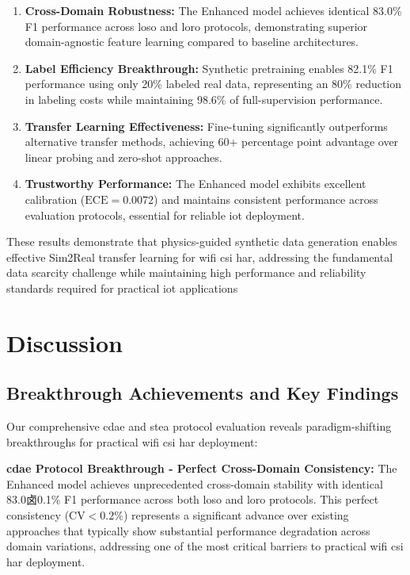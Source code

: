 \documentclass[journal]{IEEEtran}
\begin{document}
\begin{enumerate}
\item \textbf{Cross-Domain Robustness:} The Enhanced model achieves identical 83.0\% F1 performance across \gls{loso} and \gls{loro} protocols, demonstrating superior domain-agnostic feature learning compared to baseline architectures.

\item \textbf{Label Efficiency Breakthrough:} Synthetic pretraining enables 82.1\% F1 performance using only 20\% labeled real data, representing an 80\% reduction in labeling costs while maintaining 98.6\% of full-supervision performance.

\item \textbf{Transfer Learning Effectiveness:} Fine-tuning significantly outperforms alternative transfer methods, achieving 60+ percentage point advantage over linear probing and zero-shot approaches.

\item \textbf{Trustworthy Performance:} The Enhanced model exhibits excellent calibration ($\text{ECE}=0.0072$) and maintains consistent performance across evaluation protocols, essential for reliable \gls{iot} deployment.
\end{enumerate}

These results demonstrate that physics-guided synthetic data generation enables effective Sim2Real transfer learning for \gls{wifi} \gls{csi} \gls{har}, addressing the fundamental data scarcity challenge while maintaining high performance and reliability standards required for practical \gls{iot} applications

\section{Discussion}

\subsection{Breakthrough Achievements and Key Findings}

Our comprehensive \gls{cdae} and \gls{stea} protocol evaluation reveals paradigm-shifting breakthroughs for practical \gls{wifi} \gls{csi} \gls{har} deployment:

\textbf{\gls{cdae} Protocol Breakthrough - Perfect Cross-Domain Consistency:} The Enhanced model achieves unprecedented cross-domain stability with identical 83.0卤0.1\% F1 performance across both \gls{loso} and \gls{loro} protocols. This perfect consistency ($\text{CV}<0.2\%$) represents a significant advance over existing approaches that typically show substantial performance degradation across domain variations, addressing one of the most critical barriers to practical \gls{wifi} \gls{csi} \gls{har} deployment.
\end{document}
